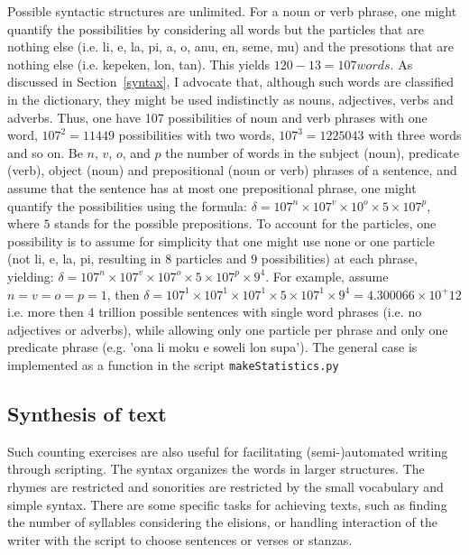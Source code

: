 \documentclass{article}
\newcommand{\tttt}[1]{\texttt{#1}}
\begin{document}
Possible syntactic structures are unlimited.
For a noun or verb phrase, one might quantify the possibilities
by considering all words but the particles that are nothing else
(i.e. li, e, la, pi, a, o, anu, en, seme, mu)
and the presotions that are nothing else (i.e. kepeken, lon, tan).
This yields $120-13=107 words$.
As discussed in Section~\ref{syntax},
I advocate that, although such words are classified in the dictionary,
they might be used indistinctly as nouns, adjectives,
verbs and adverbs.
Thus, one have 107 possibilities of noun and verb phrases with
one word, $107^2=11449$ possibilities with two words,
$107^3=1225043$ with three words and so on.
Be $n$, $v$, $o$, and $p$ the number of words in the subject (noun), predicate
(verb), object (noun) and prepositional (noun or verb) phrases of a sentence,
and assume that the sentence has at most one prepositional phrase,
one might quantify the possibilities using the formula:
$\delta = 107^n\times 107^v\times 10^o \times 5\times 107^p$,
where $5$ stands for the possible prepositions.
To account for the particles, one possibility is
to assume for simplicity that one might use none or one particle
(not li, e, la, pi, resulting in $8$ particles and $9$ possibilities)
at each phrase, yielding:
$\delta = 107^n\times 107^v\times 107^o \times 5\times 107^p\times 9^4$.
For example, assume $n=v=o=p=1$, then
$\delta=107^1\times 107^1\times 107^1 \times 5\times 107^1\times 9^4=
 4.300066\times 10^+12$
i.e. more then 4 trillion possible
sentences with single word phrases (i.e. no adjectives or adverbs),
while allowing only one particle per phrase
and only one predicate phrase 
(e.g. 'ona li moku e soweli lon supa').
The general case is implemented as a function
in the script \tttt{makeStatistics.py}~\cite{tokipona}

\subsection{Synthesis of text}\label{synth}
Such counting exercises are also useful
for facilitating (semi-)automated writing through scripting.
The syntax organizes the words in larger structures.
The rhymes are restricted and sonorities are
restricted by the small vocabulary and simple syntax.
There are some specific tasks for achieving texts,
such as finding the number of syllables considering the elisions,
or handling interaction of the writer with the script
to choose sentences or verses or stanzas.
\end{document}
